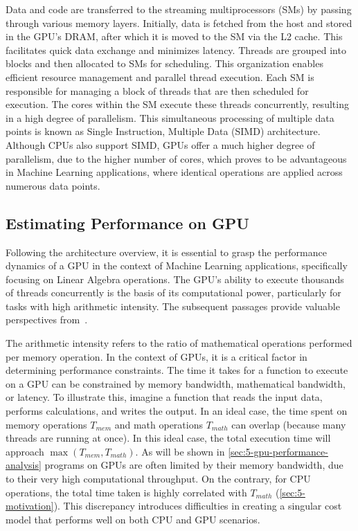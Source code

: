 Data and code are transferred to the streaming multiprocessors (SMs) by passing through various memory layers. Initially, data is fetched from the host and stored in the GPU's DRAM, after which it is moved to the SM via the L2 cache. This facilitates quick data exchange and minimizes latency. Threads are grouped into blocks and then allocated to SMs for scheduling. This organization enables efficient resource management and parallel thread execution. Each SM is responsible for managing a block of threads that are then scheduled for execution. The cores within the SM execute these threads concurrently, resulting in a high degree of parallelism. This simultaneous processing of multiple data points is known as Single Instruction, Multiple Data (SIMD) architecture. Although CPUs also support SIMD, GPUs offer a much higher degree of parallelism, due to the higher number of cores, which proves to be advantageous in Machine Learning applications, where identical operations are applied across numerous data points.

\subsection{Estimating Performance on GPU}
\label{subsec:gpu-performance}
Following the architecture overview, it is essential to grasp the performance dynamics of a GPU in the context of Machine Learning applications, specifically focusing on Linear Algebra operations. The GPU's ability to execute thousands of threads concurrently is the basis of its computational power, particularly for tasks with high arithmetic intensity. The subsequent passages provide valuable perspectives from~\cite{nvidia-gpu-performance:online}.

The arithmetic intensity refers to the ratio of mathematical operations performed per memory operation. In the context of GPUs, it is a critical factor in determining performance constraints. The time it takes for a function to execute on a GPU can be constrained by memory bandwidth, mathematical bandwidth, or latency. To illustrate this, imagine a function that reads the input data, performs calculations, and writes the output. In an ideal case, the time spent on memory operations $ T_{mem} $ and math operations $ T_{math} $ can overlap (because many threads are running at once). In this ideal case, the total execution time will approach $ \max(T_{mem}, T_{math})$. As will be shown in \autoref{sec:5-gpu-performance-analysis} programs on GPUs are often limited by their memory bandwidth, due to their very high computational throughput. On the contrary, for CPU operations, the total time taken is highly correlated with $T_{math}$ (\autoref{sec:5-motivation}). This discrepancy introduces difficulties in creating a singular cost model that performs well on both CPU and GPU scenarios.

